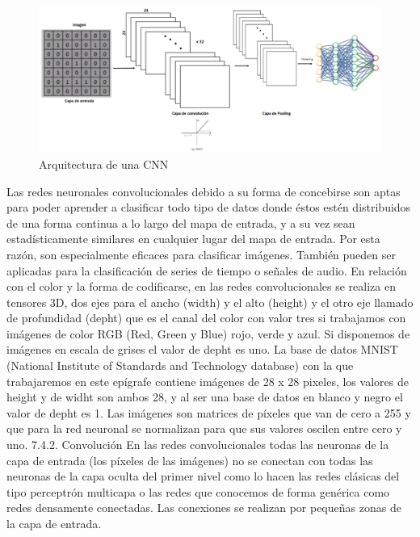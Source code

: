 \documentclass[
  a4paper,
  DIV=11,
  numbers=noendperiod]{scrreprt}
\begin{document}
\begin{figure}

{\centering \includegraphics{imagenes/capitulo1/arquitectura_convolucional.png}

}

\caption{\label{fig-arquitectura_convolucional}Arquitectura de una CNN}

\end{figure}

Las redes neuronales convolucionales debido a su forma de concebirse son
aptas para poder aprender a clasificar todo tipo de datos donde éstos
estén distribuidos de una forma continua a lo largo del mapa de entrada,
y a su vez sean estadísticamente similares en cualquier lugar del mapa
de entrada. Por esta razón, son especialmente eficaces para clasificar
imágenes. También pueden ser aplicadas para la clasificación de series
de tiempo o señales de audio. En relación con el color y la forma de
codificarse, en las redes convolucionales se realiza en tensores 3D, dos
ejes para el ancho (width) y el alto (height) y el otro eje llamado de
profundidad (depht) que es el canal del color con valor tres si
trabajamos con imágenes de color RGB (Red, Green y Blue) rojo, verde y
azul. Si disponemos de imágenes en escala de grises el valor de depht es
uno. La base de datos MNIST (National Institute of Standards and
Technology database) con la que trabajaremos en este epígrafe contiene
imágenes de 28 x 28 pixeles, los valores de height y de widht son ambos
28, y al ser una base de datos en blanco y negro el valor de depht es 1.
Las imágenes son matrices de píxeles que van de cero a 255 y que para la
red neuronal se normalizan para que sus valores oscilen entre cero y
uno. 7.4.2. Convolución En las redes convolucionales todas las neuronas
de la capa de entrada (los píxeles de las imágenes) no se conectan con
todas las neuronas de la capa oculta del primer nivel como lo hacen las
redes clásicas del tipo perceptrón multicapa o las redes que conocemos
de forma genérica como redes densamente conectadas. Las conexiones se
realizan por pequeñas zonas de la capa de entrada.
\end{document}
